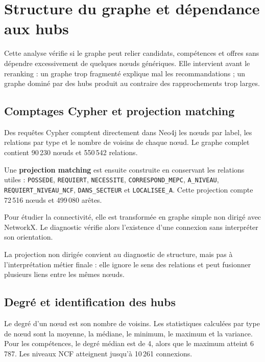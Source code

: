 \documentclass[12pt,a4paper]{article}
\begin{document}
\newpage
\section{Structure du graphe et dépendance aux hubs}

Cette analyse vérifie si le graphe peut relier candidats, compétences et offres sans dépendre
excessivement de quelques nœuds génériques. Elle intervient avant le reranking : un graphe trop
fragmenté explique mal les recommandations ; un graphe dominé par des hubs produit au contraire
des rapprochements trop larges.

\subsection{Comptages Cypher et projection matching}

Des requêtes Cypher comptent directement dans Neo4j les nœuds par label, les relations par type
et le nombre de voisins de chaque nœud. Le graphe complet contient 90\,230 nœuds et 550\,542
relations.

Une \textbf{projection matching} est ensuite construite en conservant les relations utiles :
\texttt{POSSEDE}, \texttt{REQUIERT}, \texttt{NECESSITE}, \texttt{CORRESPOND\_MEPC},
\texttt{A\_NIVEAU}, \texttt{REQUIERT\_NIVEAU\_NCF}, \texttt{DANS\_SECTEUR} et
\texttt{LOCALISEE\_A}. Cette projection compte 72\,516 nœuds et 499\,080 arêtes.

Pour étudier la connectivité, elle est transformée en graphe simple non dirigé avec NetworkX.
Le diagnostic vérifie alors l'existence d'une connexion sans interpréter son orientation.

\begin{alertbox}
La projection non dirigée convient au diagnostic de structure, mais pas à l'interprétation métier
finale : elle ignore le sens des relations et peut fusionner plusieurs liens entre les mêmes nœuds.
\end{alertbox}

\subsection{Degré et identification des hubs}

Le degré d'un nœud est son nombre de voisins. Les statistiques calculées par type de nœud sont la
moyenne, la médiane, le minimum, le maximum et la variance. Pour les compétences, le degré médian
est de 4, alors que le maximum atteint 6\,787. Les niveaux NCF atteignent jusqu'à 10\,261 connexions.
\end{document}
